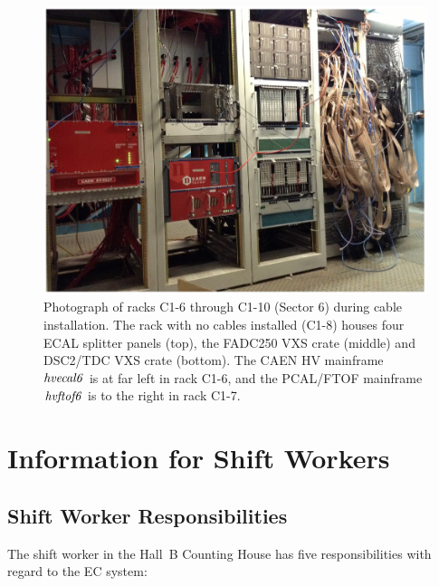 \documentclass[letterpaper,10pt]{article}
\begin{document}
\begin{figure}[htbp]
  \centering
  \includegraphics[width= 5in, keepaspectratio = true]{Sector6-electronics}
  \vspace{2mm}
  \caption{Photograph of racks C1-6 through C1-10 (Sector 6) during cable installation.  The rack with no cables installed (C1-8)
  houses four ECAL splitter panels (top), the FADC250 VXS crate (middle) and DSC2/TDC VXS crate (bottom).  The CAEN HV mainframe $\it{hvecal6}$ is at far left in rack C1-6, and the PCAL/FTOF mainframe $\it{hvftof6}$ is to the right in rack C1-7.}
  \label{fc-layout-2} 
\end{figure}


\clearpage

\vfil
\eject


\section{Information for Shift Workers}

\subsection{Shift Worker Responsibilities}

The shift worker in the Hall~B Counting House has five responsibilities with regard to the EC
system:
\end{document}
